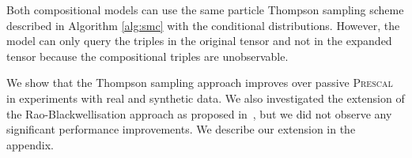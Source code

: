 Both compositional models can use the same
particle Thompson sampling scheme described in Algorithm \ref{alg:smc} with the conditional distributions.
However, the model can only query the triples in the original tensor and
not in the expanded tensor because the compositional triples are unobservable.

We show that the Thompson sampling approach improves over passive \textsc{Prescal} in
experiments with real and synthetic data.
We also investigated the extension of the Rao-Blackwellisation approach as proposed
in~\cite{kawale2015efficient}, but we did not observe any significant performance improvements.
We describe our extension in the appendix.

%
